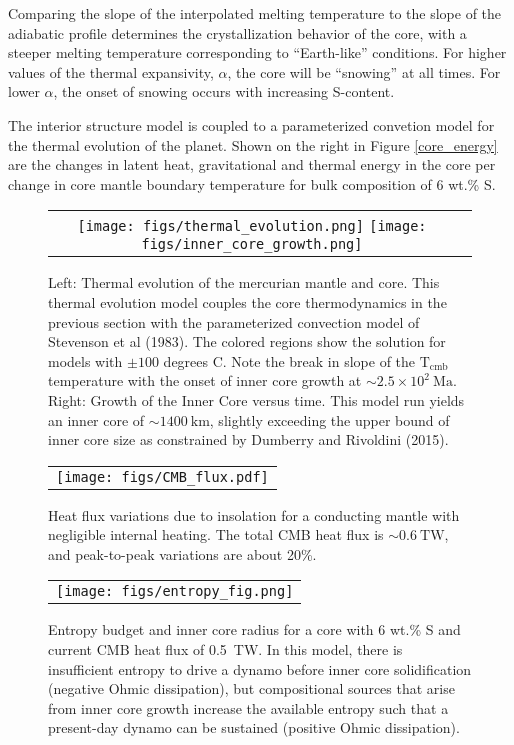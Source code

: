 Comparing the slope of the interpolated melting temperature to the slope of the
adiabatic profile determines the crystallization behavior of the core, with a
steeper melting temperature corresponding to  ``Earth-like'' conditions. For higher
values of the thermal expansivity, $\alpha$, the core will be ``snowing'' at all
times. For lower $\alpha$, the onset of snowing occurs with increasing S-content.

The interior structure model is coupled to a parameterized convetion model for
the thermal evolution of the planet. Shown on the right in Figure \ref{core_energy}
are the changes in latent heat, gravitational and thermal energy in the core per
change in core mantle boundary temperature for bulk composition of 6 wt.\% S. 


 \begin{figure}[H] %
   \centering
\begin{tabular}{cc}
 \texttt{[image: figs/thermal\_evolution.png]}
 \texttt{[image: figs/inner\_core\_growth.png]}
\end{tabular}
\caption{Left: Thermal evolution of the mercurian mantle and core. This
  thermal evolution model couples the core thermodynamics in the previous section
  with the parameterized convection model of Stevenson et al (1983). The colored
  regions show the solution for models with $\pm \mathrm{100}$ degrees C. Note the
  break in slope of the $\mathrm{T_{cmb}}$ temperature with the onset of inner core
  growth at $\sim 2.5\times10^2~\mathrm{Ma}$. Right: Growth of the Inner Core versus
  time. This model run yields an inner core of $ \sim 1400~\mathrm{km}$, slightly
exceeding the upper bound of inner core size as constrained by Dumberry and Rivoldini
(2015).}
  \label{fig:thermal}
\end{figure}


 \begin{figure}[H] %
   \centering
\begin{tabular}{c}
 \texttt{[image: figs/CMB\_flux.pdf]} 
\end{tabular}
\caption{ Heat flux variations due to insolation for a conducting mantle with negligible internal heating. The total CMB heat flux is $\sim 0.6~\mathrm{TW}$, and peak-to-peak variations are about 20\%. }
\label{fig:flux}
\end{figure}

 \begin{figure}[H] %
   \centering
\begin{tabular}{c}
 \texttt{[image: figs/entropy\_fig.png]} 
\end{tabular}
\caption{Entropy budget and inner core radius for a core with 6 wt.\% S and
  current CMB heat flux of 0.5~TW. In this model, there is insufficient entropy to
  drive a dynamo before inner core solidification (negative Ohmic dissipation), but
  compositional sources that arise from inner core growth increase the available
entropy such that a present-day dynamo can be sustained (positive Ohmic dissipation). }
\label{entropy}
\end{figure}

